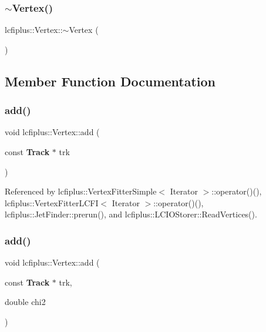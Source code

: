 \mbox{\label{classlcfiplus_1_1Vertex_a9a0d17624b18561069da6ed416613c51}} 
\subsubsection{$\sim$\+Vertex()}
{\footnotesize\ttfamily lcfiplus\+::\+Vertex\+::$\sim$\+Vertex (\begin{DoxyParamCaption}{ }\end{DoxyParamCaption})\hspace{0.3cm}{\ttfamily [inline]}}



\subsection{Member Function Documentation}
\mbox{\label{classlcfiplus_1_1Vertex_a16c62323c6454ff4343257028ee0c78c}} 
\subsubsection{add()\hspace{0.1cm}{\footnotesize\ttfamily [1/2]}}
{\footnotesize\ttfamily void lcfiplus\+::\+Vertex\+::add (\begin{DoxyParamCaption}\item[{const \textbf{ Track} $\ast$}]{trk }\end{DoxyParamCaption})}



Referenced by lcfiplus\+::\+Vertex\+Fitter\+Simple$<$ Iterator $>$\+::operator()(), lcfiplus\+::\+Vertex\+Fitter\+L\+C\+F\+I$<$ Iterator $>$\+::operator()(), lcfiplus\+::\+Jet\+Finder\+::prerun(), and lcfiplus\+::\+L\+C\+I\+O\+Storer\+::\+Read\+Vertices().

\mbox{\label{classlcfiplus_1_1Vertex_a19c9a330bf712a1251f63c0dccb7ff7c}} 
\subsubsection{add()\hspace{0.1cm}{\footnotesize\ttfamily [2/2]}}
{\footnotesize\ttfamily void lcfiplus\+::\+Vertex\+::add (\begin{DoxyParamCaption}\item[{const \textbf{ Track} $\ast$}]{trk,  }\item[{double}]{chi2 }\end{DoxyParamCaption})}


